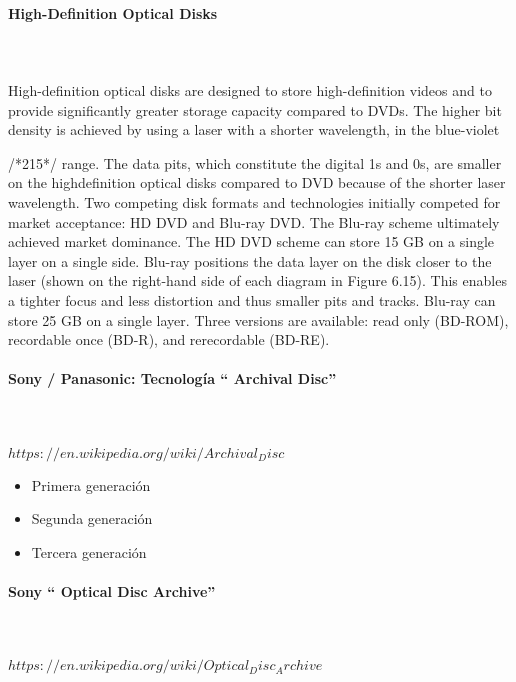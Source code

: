 \paragraph{High-Definition Optical Disks}\mbox{}\\\\%

High-definition optical disks are designed to store high-definition videos and to
provide significantly greater storage capacity compared to DVDs. The higher bit
density is achieved by using a laser with a shorter wavelength, in the blue-violet

/*215*/
range. The data pits, which constitute the digital 1s and 0s, are smaller on the highdefinition
optical disks compared to DVD because of the shorter laser wavelength.
Two competing disk formats and technologies initially competed for market
acceptance: HD DVD and Blu-ray DVD. The Blu-ray scheme ultimately achieved
market dominance. The HD DVD scheme can store 15 GB on a single layer on a
single side. Blu-ray positions the data layer on the disk closer to the laser (shown on
the right-hand side of each diagram in Figure 6.15). This enables a tighter focus and
less distortion and thus smaller pits and tracks. Blu-ray can store 25 GB on a single
layer. Three versions are available: read only (BD-ROM), recordable once (BD-R),
and rerecordable (BD-RE).

\paragraph{Sony / Panasonic: Tecnología “ Archival Disc”}\mbox{}\\\\%

$https://en.wikipedia.org/wiki/Archival_Disc$
\begin{itemize}
\item Primera generación
\item Segunda generación
\item Tercera generación
\end{itemize}

\paragraph{Sony “ Optical Disc Archive”}\mbox{}\\\\%

$https://en.wikipedia.org/wiki/Optical_Disc_Archive$










